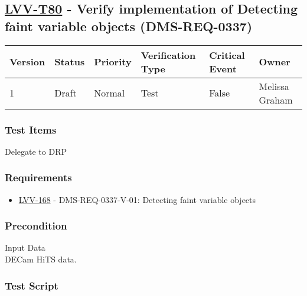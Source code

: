 \hypertarget{lvv-t80---verify-implementation-of-detecting-faint-variable-objects-dms-req-0337}{%
\subsection{\texorpdfstring{\href{https://jira.lsstcorp.org/secure/Tests.jspa\#/testCase/LVV-T80}{LVV-T80}
- Verify implementation of Detecting faint variable objects
(DMS-REQ-0337)}{LVV-T80 - Verify implementation of Detecting faint variable objects (DMS-REQ-0337)}}\label{lvv-t80---verify-implementation-of-detecting-faint-variable-objects-dms-req-0337}}

\begin{longtable}[]{@{}llllll@{}}
\toprule
Version & Status & Priority & Verification Type & Critical Event &
Owner\tabularnewline
\midrule
\endhead
1 & Draft & Normal & Test & False & Melissa Graham\tabularnewline
\bottomrule
\end{longtable}

\hypertarget{test-items-169}{%
\subsubsection{Test Items}\label{test-items-169}}

Delegate to DRP

\hypertarget{requirements-170}{%
\subsubsection{Requirements}\label{requirements-170}}

\begin{itemize}
\tightlist
\item
  \href{https://jira.lsstcorp.org/browse/LVV-168}{LVV-168} -
  DMS-REQ-0337-V-01: Detecting faint variable objects
\end{itemize}

\hypertarget{precondition-9}{%
\subsubsection{Precondition}\label{precondition-9}}

Input Data\\
DECam HiTS data.

\hypertarget{test-script-170}{%
\subsubsection{Test Script}\label{test-script-170}}

